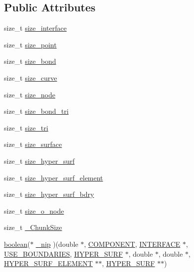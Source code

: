 \subsection*{Public Attributes}
\begin{DoxyCompactItemize}
\item 
size\+\_\+t \hyperlink{struct___i___u_s_e_r___i_n_t_e_r_f_a_c_e_a1fba52945b6e8297ce8bc7e3135e5fdc}{size\+\_\+interface}
\item 
size\+\_\+t \hyperlink{struct___i___u_s_e_r___i_n_t_e_r_f_a_c_e_a0dc89f5b398f0f4809f793b945c847ee}{size\+\_\+point}
\item 
size\+\_\+t \hyperlink{struct___i___u_s_e_r___i_n_t_e_r_f_a_c_e_ad1fcbba145ffd4990b1f251a5fe0d0e5}{size\+\_\+bond}
\item 
size\+\_\+t \hyperlink{struct___i___u_s_e_r___i_n_t_e_r_f_a_c_e_a12b7a2f2953e01b01a96acb0b1e44d60}{size\+\_\+curve}
\item 
size\+\_\+t \hyperlink{struct___i___u_s_e_r___i_n_t_e_r_f_a_c_e_ab3ef3ba56406edf5c69d5ebf52ae9b8f}{size\+\_\+node}
\item 
size\+\_\+t \hyperlink{struct___i___u_s_e_r___i_n_t_e_r_f_a_c_e_a1e795c5e1443749b125e7c5436b61c94}{size\+\_\+bond\+\_\+tri}
\item 
size\+\_\+t \hyperlink{struct___i___u_s_e_r___i_n_t_e_r_f_a_c_e_acac83f22ebf46e56b3330a30c3189edb}{size\+\_\+tri}
\item 
size\+\_\+t \hyperlink{struct___i___u_s_e_r___i_n_t_e_r_f_a_c_e_add9a2eb9460df7025ff0c4301a0207a2}{size\+\_\+surface}
\item 
size\+\_\+t \hyperlink{struct___i___u_s_e_r___i_n_t_e_r_f_a_c_e_aea7bbc6eef78aded0040bb858d901090}{size\+\_\+hyper\+\_\+surf}
\item 
size\+\_\+t \hyperlink{struct___i___u_s_e_r___i_n_t_e_r_f_a_c_e_a348a857732f4687d88cd4c6ba0d9e783}{size\+\_\+hyper\+\_\+surf\+\_\+element}
\item 
size\+\_\+t \hyperlink{struct___i___u_s_e_r___i_n_t_e_r_f_a_c_e_a6dc95ac5de4ab92c824b5cd62dcd241c}{size\+\_\+hyper\+\_\+surf\+\_\+bdry}
\item 
size\+\_\+t \hyperlink{struct___i___u_s_e_r___i_n_t_e_r_f_a_c_e_a38fe8c3958935262460fd895c26731ee}{size\+\_\+o\+\_\+node}
\item 
size\+\_\+t \hyperlink{struct___i___u_s_e_r___i_n_t_e_r_f_a_c_e_a79a2c603a8f76b625fa0eadca11df3ef}{\+\_\+\+Chunk\+Size}
\item 
\hyperlink{cdecs_8h_ad048433382a936258fb49e2ec4f148e1}{boolean}($\ast$ \hyperlink{struct___i___u_s_e_r___i_n_t_e_r_f_a_c_e_a5fb4b62c33300ef91f30cfd6d7a610ed}{\+\_\+nip} )(double $\ast$, \hyperlink{int_8h_a2bb7be12ca59ea6443c8757df0a7c278}{C\+O\+M\+P\+O\+N\+E\+NT}, \hyperlink{int_8h_a58cf562d0d320a608294b7310ea167dc}{I\+N\+T\+E\+R\+F\+A\+CE} $\ast$, \hyperlink{int_8h_a53a78098f0847c37c09b2fa46cc16487}{U\+S\+E\+\_\+\+B\+O\+U\+N\+D\+A\+R\+I\+ES}, \hyperlink{int_8h_acef50fa4757ce0d3f75c97fab5a175bc}{H\+Y\+P\+E\+R\+\_\+\+S\+U\+RF} $\ast$, double $\ast$, double $\ast$, \hyperlink{int_8h_a17e21ae7174174d7a55516f8c9a8f12f}{H\+Y\+P\+E\+R\+\_\+\+S\+U\+R\+F\+\_\+\+E\+L\+E\+M\+E\+NT} $\ast$$\ast$, \hyperlink{int_8h_acef50fa4757ce0d3f75c97fab5a175bc}{H\+Y\+P\+E\+R\+\_\+\+S\+U\+RF} $\ast$$\ast$)

\end{DoxyCompactItemize}
